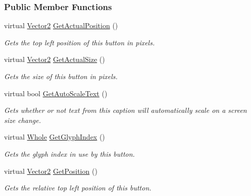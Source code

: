 \subsubsection*{Public Member Functions}
\begin{DoxyCompactItemize}
\item 
virtual \hyperlink{classphys_1_1Vector2}{Vector2} \hyperlink{classphys_1_1UI_1_1TextButton_ab406bec58bf6244c3e867fefd19d4d7f}{GetActualPosition} ()
\begin{DoxyCompactList}\small\item\em Gets the top left position of this button in pixels. \item\end{DoxyCompactList}\item 
virtual \hyperlink{classphys_1_1Vector2}{Vector2} \hyperlink{classphys_1_1UI_1_1TextButton_a062b31c199f875d4f825f6be1d11fb55}{GetActualSize} ()
\begin{DoxyCompactList}\small\item\em Gets the size of this button in pixels. \item\end{DoxyCompactList}\item 
virtual bool \hyperlink{classphys_1_1UI_1_1TextButton_a0fed05cef1c311aa1b08c8f1a6830988}{GetAutoScaleText} ()
\begin{DoxyCompactList}\small\item\em Gets whether or not text from this caption will automatically scale on a screen size change. \item\end{DoxyCompactList}\item 
virtual \hyperlink{namespacephys_a460f6bc24c8dd347b05e0366ae34f34a}{Whole} \hyperlink{classphys_1_1UI_1_1TextButton_a93f53557fcea98ea2426b798628e310f}{GetGlyphIndex} ()
\begin{DoxyCompactList}\small\item\em Gets the glyph index in use by this button. \item\end{DoxyCompactList}\item 
virtual \hyperlink{classphys_1_1Vector2}{Vector2} \hyperlink{classphys_1_1UI_1_1TextButton_a09768e0666a109b7d35fd8b78240cfd3}{GetPosition} ()
\begin{DoxyCompactList}\small\item\em Gets the relative top left position of this button. \item\end{DoxyCompactList}\item 

\end{DoxyCompactItemize}
